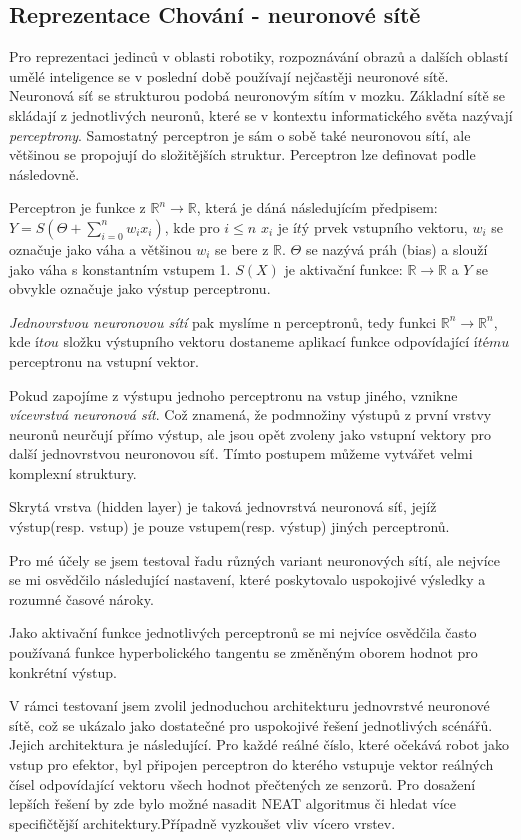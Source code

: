\subsection*{Reprezentace Chování - neuronové sítě}
Pro reprezentaci jedinců v oblasti robotiky, rozpoznávání obrazů a dalších oblastí umělé inteligence se v poslední době používají nejčastěji neuronové sítě. Neuronová síť se strukturou podobá neuronovým sítím v mozku. Základní sítě se skládají z jednotlivých neuronů, které se v kontextu informatického světa nazývají \textit{perceptrony}. Samostatný perceptron je sám o sobě také neuronovou sítí, ale většinou se propojují do složitějších struktur. Perceptron lze definovat podle \citep{neuron} následovně.
\begin{definice}[Perceptron] Perceptron je funkce z $\mathbb{R}^n \rightarrow \mathbb{R}$, která je dáná následujícím předpisem: 	$Y = S(\Theta + \sum_{i=0}^{n} w_i x_i)$, kde pro $i \leq n$ $x_{i}$ je $ítý$ prvek vstupního vektoru, $w_{i}$ se označuje jako váha a většinou $w_{i} $ se bere z $\mathbb{R}$.  $\Theta$ se nazývá práh (bias) a slouží jako váha s konstantním vstupem 1.  $S(X)$ je aktivační funkce: $\mathbb{R} \rightarrow \mathbb{R}$ a $Y$ se obvykle označuje jako výstup perceptronu.
\end{definice}
\textit{Jednovrstvou neuronovou sítí} pak myslíme n perceptronů, tedy funkci $\mathbb{R}^{n} \rightarrow \mathbb{R}^{n}$, kde $ítou$ složku výstupního vektoru dostaneme aplikací funkce odpovídající $ítému$ perceptronu na vstupní vektor.
\par
Pokud zapojíme z výstupu jednoho perceptronu na vstup jiného, vznikne \textit{vícevrstvá neuronová sít}. Což znamená, že podmnožiny výstupů z první vrstvy neuronů neurčují přímo výstup, ale jsou opět zvoleny jako vstupní vektory pro další jednovrstvou neuronovou síť. Tímto postupem můžeme vytvářet velmi komplexní struktury.
\par
Skrytá vrstva (hidden layer) je taková jednovrstvá neuronová síť, jejíž výstup(resp. vstup) je pouze vstupem(resp. výstup) jiných perceptronů.
\par
{}
Pro mé účely se jsem testoval řadu různých variant neuronových sítí, ale nejvíce se mi osvědčilo následující nastavení, které poskytovalo uspokojivé výsledky a rozumné časové nároky. 
\par 
Jako aktivační funkce jednotlivých perceptronů se mi nejvíce osvědčila často používaná funkce hyperbolického tangentu se změněným oborem hodnot pro konkrétní výstup.
\par
V rámci testovaní jsem zvolil jednoduchou architekturu jednovrstvé neuronové sítě, což se ukázalo jako dostatečné pro uspokojivé řešení jednotlivých scénářů. Jejich architektura je následující. Pro každé reálné číslo, které očekává robot jako vstup pro efektor, byl připojen perceptron do kterého vstupuje vektor reálných čísel odpovídající vektoru všech hodnot přečtených ze senzorů.  Pro dosažení lepších řešení by zde bylo možné nasadit NEAT algoritmus či hledat více specifičtější architektury.Případně vyzkoušet vliv vícero vrstev. 
